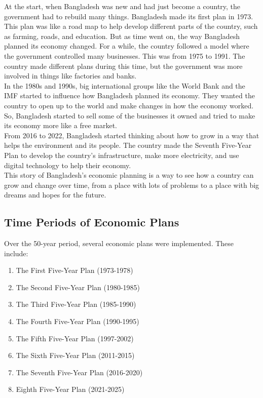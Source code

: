 At the start, when Bangladesh was new and had just become a country, the government had to rebuild many things. 
Bangladesh made its first plan in 1973. This plan was like a road map to help develop different parts of 
the country, such as farming, roads, and education. But as time went on, the way Bangladesh planned its economy 
changed. For a while, the country followed a model where the government controlled many businesses. 
This was from 1975 to 1991. The country made different plans during this time, but the government was more 
involved in things like factories and banks.\\

In the 1980s and 1990s, big international groups like the World Bank and the IMF started 
to influence how Bangladesh planned its economy. They wanted the country to open up to 
the world and make changes in how the economy worked. So, Bangladesh started to sell some of 
the businesses it owned and tried to make its economy more like a free market.\\

From 2016 to 2022, Bangladesh started thinking about how to grow in a way that helps 
the environment and its people. The country made the Seventh Five-Year Plan to develop 
the country's infrastructure, make more electricity, and use digital technology to help their economy.\\

This story of Bangladesh's economic planning is a way to see how a country can grow and change over time, 
from a place with lots of problems to a place with big dreams and hopes for the future.



\subsection{Time Periods of Economic Plans}
Over the 50-year period, several economic plans were implemented. These include:
\begin{enumerate}
	\item The First Five-Year Plan (1973-1978)
	\item The Second Five-Year Plan (1980-1985)
	\item The Third Five-Year Plan (1985-1990)
	\item The Fourth Five-Year Plan (1990-1995)
	\item The Fifth Five-Year Plan (1997-2002)
	\item The Sixth Five-Year Plan (2011-2015)
	\item The Seventh Five-Year Plan (2016-2020)
	\item  Eighth Five-Year Plan (2021-2025)
\end{enumerate}


